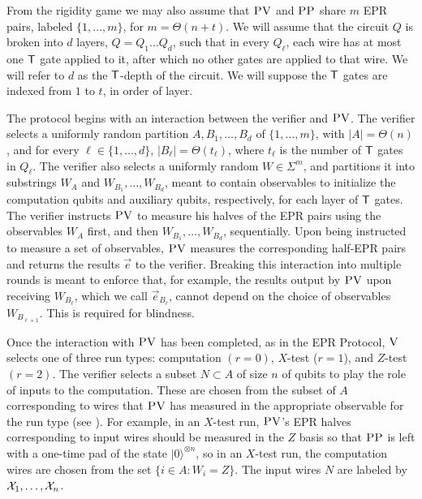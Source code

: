 \documentclass{toc}
\newcommand{\ket}[1]{|#1\rangle}
\newcommand{\ver}{\textsc{V}}
\newcommand{\pv}{\textsc{PV}}
\newcommand{\pp}{\textsc{PP}}
\begin{document}
From the rigidity game we may also assume that $\pv$ and $\pp$ share $m$ EPR pairs, labeled $\{1,\ldots,m\}$, for $m=\Theta(n+t)$. We will assume that the circuit $Q$ is broken into $d$ layers, $Q=Q_1\dots Q_d$, such that in every $Q_\ell$, each wire has at most one $\sf T$ gate applied to it, after which no other gates are applied to that wire. We will refer to $d$ as the $\sf T$-depth of the circuit. We will suppose the $\sf T$ gates are indexed from $1$ to $t$, in order of layer.
 
The protocol begins with an interaction between the verifier and $\pv$. The verifier selects a uniformly random partition $A,B_1,\dots,B_d$ of $\{1,\dots,m\}$, with $|A|=\Theta(n)$, and for every $\ell\in\{1,\dots,d\}$, $|B_{\ell}|=\Theta(t_\ell)$, where $t_{\ell}$ is the number of $\sf T$ gates in $Q_\ell$. The verifier also selects a uniformly random $W\in\Sigma^m$, and partitions it into substrings $W_A$ and $W_{B_1},\ldots,W_{B_d}$, meant to contain observables to initialize the computation qubits and auxiliary qubits,
respectively, %
 for each layer of ${\sf T}$ gates.
The verifier instructs $\pv$ to measure his halves of the EPR pairs using the observables $W_A$ first, and then $W_{B_1},\ldots,W_{B_d}$, sequentially. Upon being instructed to measure a set of observables, $\pv$ measures the corresponding half-EPR pairs and returns the results $\vec{e}$ to the verifier. Breaking this interaction into multiple rounds is meant to enforce that, for example, the results output by $\pv$ upon receiving $W_{B_{\ell}}$, which we call $\vec{e}_{B_{\ell}}$, cannot depend on the choice of observables $W_{B_{\ell+1}}$. This is required for blindness. 

Once the interaction with $\pv$ has been completed, as in the EPR Protocol, $\ver$ selects one of three run types: computation $(r=0)$, $X$-test ($r=1$), and $Z$-test $(r=2)$. 
The verifier selects a subset $N\subset A$ of size $n$ of qubits to play the role of inputs to the computation. These are chosen from the subset of $A$ corresponding to wires that $\pv$ has measured in the appropriate observable for the run type (see ). For example, in an $X$-test run, $\pv$'s EPR halves corresponding to input wires should be measured in the $Z$ basis so that $\pp$ is left with a one-time pad of the state $\ket{0}^{\otimes n}$, so in an $X$-test run, the computation wires are chosen from the set $\{i\in A:W_i=Z\}$. The input wires $N$ are labeled by ${\cal X}_1,\dots,{\cal X}_n$. 
\end{document}

